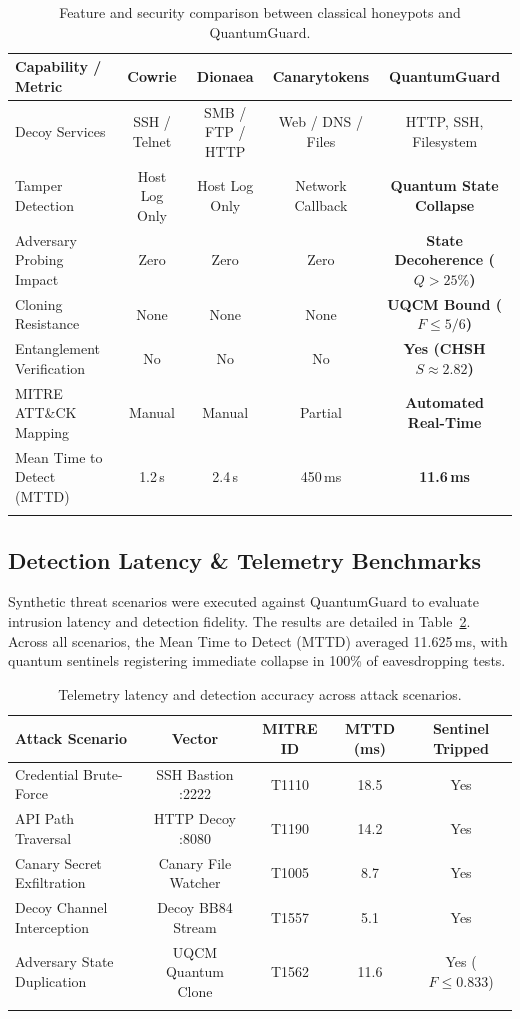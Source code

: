 \documentclass[pdflatex,sn-mathphys-num]{sn-jnl}
\theoremstyle{thmstyleone}
\theoremstyle{thmstyletwo}
\theoremstyle{thmstylethree}
\begin{document}
\begin{table}[h]
\caption{Feature and security comparison between classical honeypots and QuantumGuard.}\label{tab:comparison}
\begin{tabular*}{\textwidth}{@{\extracolsep\fill}lcccc@{}}
\toprule
Capability / Metric & Cowrie & Dionaea & Canarytokens & \textbf{QuantumGuard} \\
\midrule
Decoy Services & SSH / Telnet & SMB / FTP / HTTP & Web / DNS / Files & HTTP, SSH, Filesystem \\
Tamper Detection & Host Log Only & Host Log Only & Network Callback & \textbf{Quantum State Collapse} \\
Adversary Probing Impact & Zero & Zero & Zero & \textbf{State Decoherence ($Q > 25\%$)} \\
Cloning Resistance & None & None & None & \textbf{UQCM Bound ($F \le 5/6$)} \\
Entanglement Verification & No & No & No & \textbf{Yes (CHSH $S \approx 2.82$)} \\
MITRE ATT\&CK Mapping & Manual & Manual & Partial & \textbf{Automated Real-Time} \\
Mean Time to Detect (MTTD) & 1.2\,s & 2.4\,s & 450\,ms & \textbf{11.6\,ms} \\
\botrule
\end{tabular*}
\end{table}

\subsection{Detection Latency & Telemetry Benchmarks}

Synthetic threat scenarios were executed against QuantumGuard to evaluate intrusion latency and detection fidelity. The results are detailed in Table~\ref{tab:latency}. Across all scenarios, the Mean Time to Detect (MTTD) averaged 11.625\,ms, with quantum sentinels registering immediate collapse in 100\% of eavesdropping tests.

\begin{table}[h]
\caption{Telemetry latency and detection accuracy across attack scenarios.}\label{tab:latency}
\begin{tabular*}{\textwidth}{@{\extracolsep\fill}lcccc@{}}
\toprule
Attack Scenario & Vector & MITRE ID & MTTD (ms) & Sentinel Tripped \\
\midrule
Credential Brute-Force & SSH Bastion :2222 & T1110 & 18.5 & Yes \\
API Path Traversal & HTTP Decoy :8080 & T1190 & 14.2 & Yes \\
Canary Secret Exfiltration & Canary File Watcher & T1005 & 8.7 & Yes \\
Decoy Channel Interception & Decoy BB84 Stream & T1557 & 5.1 & Yes \\
Adversary State Duplication & UQCM Quantum Clone & T1562 & 11.6 & Yes ($F \le 0.833$) \\
\botrule
\end{tabular*}
\end{table}
\end{document}
